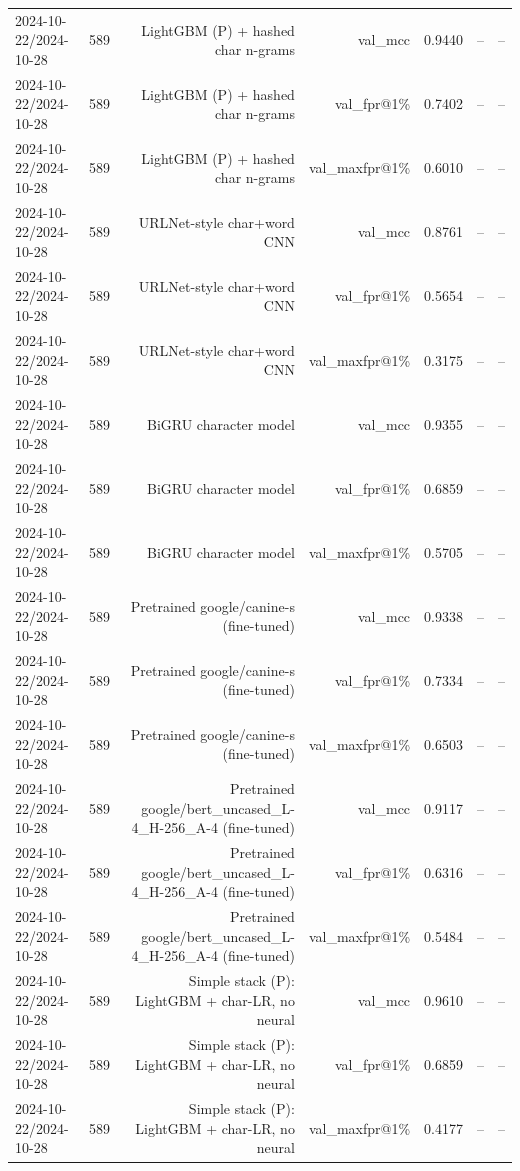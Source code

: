 \begin{table}[t]
\begin{tabular}{llrrrrr}
2024-10-22/2024-10-28 & 589 & LightGBM (P) + hashed char n-grams & val\_mcc & 0.9440 & -- & -- \\
2024-10-22/2024-10-28 & 589 & LightGBM (P) + hashed char n-grams & val\_fpr@1\% & 0.7402 & -- & -- \\
2024-10-22/2024-10-28 & 589 & LightGBM (P) + hashed char n-grams & val\_maxfpr@1\% & 0.6010 & -- & -- \\
2024-10-22/2024-10-28 & 589 & URLNet-style char+word CNN & val\_mcc & 0.8761 & -- & -- \\
2024-10-22/2024-10-28 & 589 & URLNet-style char+word CNN & val\_fpr@1\% & 0.5654 & -- & -- \\
2024-10-22/2024-10-28 & 589 & URLNet-style char+word CNN & val\_maxfpr@1\% & 0.3175 & -- & -- \\
2024-10-22/2024-10-28 & 589 & BiGRU character model & val\_mcc & 0.9355 & -- & -- \\
2024-10-22/2024-10-28 & 589 & BiGRU character model & val\_fpr@1\% & 0.6859 & -- & -- \\
2024-10-22/2024-10-28 & 589 & BiGRU character model & val\_maxfpr@1\% & 0.5705 & -- & -- \\
2024-10-22/2024-10-28 & 589 & Pretrained google/canine-s (fine-tuned) & val\_mcc & 0.9338 & -- & -- \\
2024-10-22/2024-10-28 & 589 & Pretrained google/canine-s (fine-tuned) & val\_fpr@1\% & 0.7334 & -- & -- \\
2024-10-22/2024-10-28 & 589 & Pretrained google/canine-s (fine-tuned) & val\_maxfpr@1\% & 0.6503 & -- & -- \\
2024-10-22/2024-10-28 & 589 & Pretrained google/bert\_uncased\_L-4\_H-256\_A-4 (fine-tuned) & val\_mcc & 0.9117 & -- & -- \\
2024-10-22/2024-10-28 & 589 & Pretrained google/bert\_uncased\_L-4\_H-256\_A-4 (fine-tuned) & val\_fpr@1\% & 0.6316 & -- & -- \\
2024-10-22/2024-10-28 & 589 & Pretrained google/bert\_uncased\_L-4\_H-256\_A-4 (fine-tuned) & val\_maxfpr@1\% & 0.5484 & -- & -- \\
2024-10-22/2024-10-28 & 589 & Simple stack (P): LightGBM + char-LR, no neural & val\_mcc & 0.9610 & -- & -- \\
2024-10-22/2024-10-28 & 589 & Simple stack (P): LightGBM + char-LR, no neural & val\_fpr@1\% & 0.6859 & -- & -- \\
2024-10-22/2024-10-28 & 589 & Simple stack (P): LightGBM + char-LR, no neural & val\_maxfpr@1\% & 0.4177 & -- & -- \\

\end{tabular}
\end{table}
